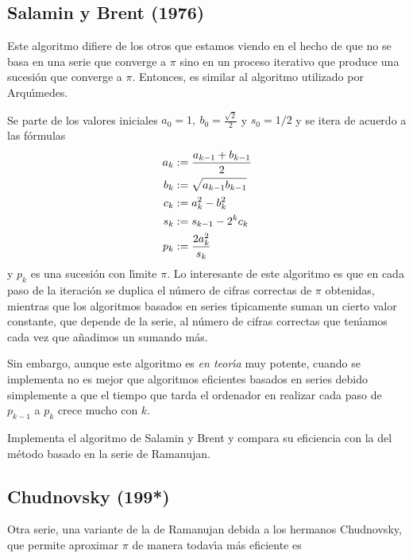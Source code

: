 \subsection{Salamin y Brent (1976)}\label{iterat}

Este algoritmo difiere de los otros que estamos viendo en el hecho de que no se
basa en una serie que converge a $\pi$ sino en un proceso iterativo que produce
una sucesi\'on que converge a $\pi$. Entonces, es similar al algoritmo utilizado
por Arqu\'{\i}medes. 

Se parte de los valores iniciales $a_0=1,\ b_0=\frac{\sqrt{2}}{2}$ y $s_0=1/2$ y
se itera de acuerdo a las f\'ormulas
\begin{equation}\notag
 \begin{aligned}
  a_k&:=\frac{a_{k-1}+b_{k-1}}{2} \\
   b_k&:=\sqrt{a_{k-1}b_{k-1}} \\
   c_k&:=a_k^2-b_k^2 \\
   s_k&:=s_{k-1}-2^kc_k \\
   p_k&:=\frac{2a_k^2}{s_k} \\
 \end{aligned}
\end{equation}
\noindent y $p_k$ es una sucesi\'on con l\'{\i}mite $\pi$. Lo interesante de
este algoritmo es que en cada paso de la iteraci\'on se {\sc duplica} el
n\'umero de cifras correctas de $\pi$ obtenidas, mientras que los algoritmos
basados en series t\'{\i}picamente suman un cierto valor constante, que depende
de la serie,  al  
n\'umero de cifras correctas que ten\'{\i}amos cada vez que a\~nadimos un
sumando m\'as.

Sin embargo, aunque este algoritmo es {\itshape en teor\'{\i}a} muy potente,
cuando se
implementa no es mejor que algoritmos eficientes basados en series debido
simplemente a que el tiempo que tarda el ordenador en  realizar cada
paso de $p_{k-1}$ a $p_k$  crece mucho con $k$. 

\begin{ejer}

Implementa el algoritmo de Salamin y Brent y compara su eficiencia con la del
m\'etodo basado en  la serie de Ramanujan.
\end{ejer}


\subsection{Chudnovsky (199*)}\label{chud}

Otra serie, una variante de la de Ramanujan debida a los hermanos
Chudnovsky,   que permite aproximar   $\pi$ de manera todav\'{\i}a m\'as
eficiente es 

